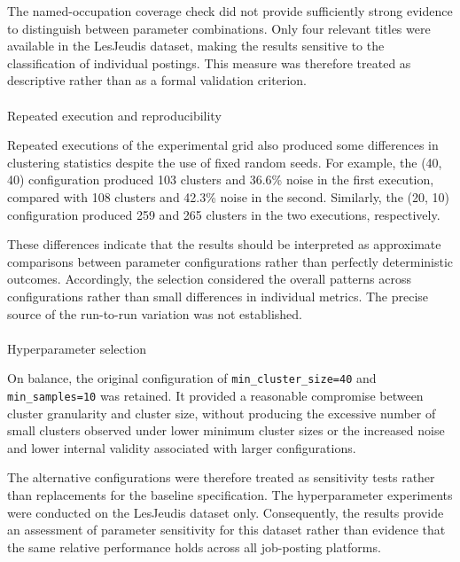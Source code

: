 \documentclass[
  letterpaper,
  DIV=11,
  numbers=noendperiod,
  sfdefaults=false]{scrartcl}
\makeatletter
\let\oldparagraph\paragraph
\renewcommand{\paragraph}{
    \@ifstar
      \xxxParagraphStar
      \xxxParagraphNoStar
  }
\newcommand{\xxxParagraphStar}[1]{\oldparagraph*{#1}\mbox{}}
\newcommand{\xxxParagraphNoStar}[1]{\oldparagraph{#1}\mbox{}}
\makeatother
\begin{document}
The named-occupation coverage check did not provide sufficiently strong
evidence to distinguish between parameter combinations. Only four
relevant titles were available in the LesJeudis dataset, making the
results sensitive to the classification of individual postings. This
measure was therefore treated as descriptive rather than as a formal
validation criterion.

\paragraph{Repeated execution and
reproducibility}\label{repeated-execution-and-reproducibility}

Repeated executions of the experimental grid also produced some
differences in clustering statistics despite the use of fixed random
seeds. For example, the (40, 40) configuration produced 103 clusters and
36.6\% noise in the first execution, compared with 108 clusters and
42.3\% noise in the second. Similarly, the (20, 10) configuration
produced 259 and 265 clusters in the two executions, respectively.

These differences indicate that the results should be interpreted as
approximate comparisons between parameter configurations rather than
perfectly deterministic outcomes. Accordingly, the selection considered
the overall patterns across configurations rather than small differences
in individual metrics. The precise source of the run-to-run variation
was not established.

\paragraph{Hyperparameter selection}\label{hyperparameter-selection}

On balance, the original configuration of \texttt{min\_cluster\_size=40}
and \texttt{min\_samples=10} was retained. It provided a reasonable
compromise between cluster granularity and cluster size, without
producing the excessive number of small clusters observed under lower
minimum cluster sizes or the increased noise and lower internal validity
associated with larger configurations.

The alternative configurations were therefore treated as sensitivity
tests rather than replacements for the baseline specification. The
hyperparameter experiments were conducted on the LesJeudis dataset only.
Consequently, the results provide an assessment of parameter sensitivity
for this dataset rather than evidence that the same relative performance
holds across all job-posting platforms.
\end{document}

